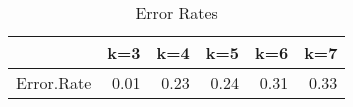 \begin{table}[ht]
\centering
\caption{Error Rates}
\begin{tabular}{rrrrrr}
  \hline
 & k=3 & k=4 & k=5 & k=6 & k=7 \\ 
  \hline
Error.Rate & 0.01 & 0.23 & 0.24 & 0.31 & 0.33 \\ 
   \hline
\end{tabular}
\end{table}
